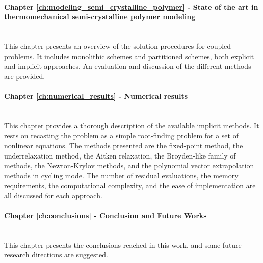 \paragraph{Chapter \ref{ch:modeling_semi_crystalline_polymer} - State of the art in thermomechanical semi-crystalline polymer modeling}\mbox{}\\
This chapter presents an overview of the solution procedures for coupled problems.
It includes monolithic schemes and partitioned schemes, both explicit and implicit approaches.
An evaluation and discussion of the different methods are provided.

\paragraph{Chapter \ref{ch:numerical_results} - Numerical results}\mbox{}\\
This chapter provides a thorough description of the available implicit methods.
It rests on recasting the problem as a simple root-finding problem for a set of nonlinear equations.
The methods presented are the fixed-point method, the underrelaxation method, the Aitken relaxation, the Broyden-like family of methods, the Newton-Krylov methods, and the polynomial vector extrapolation methods in cycling mode.
The number of residual evaluations, the memory requirements, the computational complexity, and the ease of implementation are all discussed for each approach.

\paragraph{Chapter \ref{ch:conclusions} - Conclusion and Future Works}\mbox{} \\
This chapter presents the conclusions reached in this work, and some future research directions are suggested.

\newpage\null\thispagestyle{blank}\newpage
